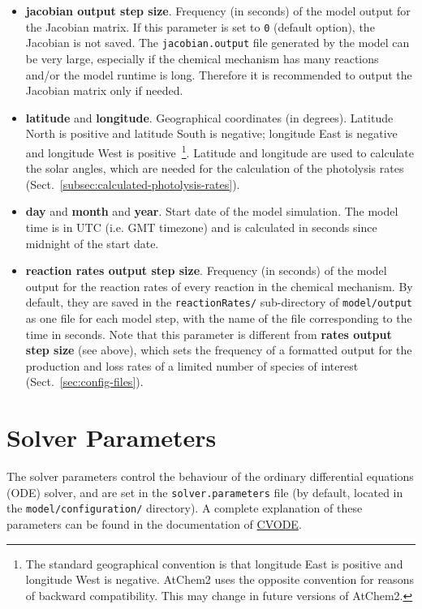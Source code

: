 \begin{itemize}
\item \textbf{jacobian output step size}. Frequency (in seconds) of
  the model output for the Jacobian matrix. If this parameter is set
  to \texttt{0} (default option), the Jacobian is not saved. The
  \texttt{jacobian.output} file generated by the model can be very
  large, especially if the chemical mechanism has many reactions
  and/or the model runtime is long. Therefore it is recommended to
  output the Jacobian matrix only if needed.
\item \textbf{latitude} and \textbf{longitude}. Geographical
  coordinates (in degrees). Latitude North is positive and latitude
  South is negative; longitude East is negative and longitude West is
  positive~\footnote{The standard geographical convention is that
    longitude East is positive and longitude West is negative. AtChem2
    uses the opposite convention for reasons of backward
    compatibility. This may change in future versions of
    AtChem2.}. Latitude and longitude are used to calculate the solar
  angles, which are needed for the calculation of the photolysis rates
  (Sect.~\ref{subsec:calculated-photolysis-rates}).
\item \textbf{day} and \textbf{month} and \textbf{year}. Start date of
  the model simulation. The model time is in UTC (i.e. GMT timezone)
  and is calculated in seconds since midnight of the start date.
\item \textbf{reaction rates output step size}. Frequency (in seconds)
  of the model output for the reaction rates of every reaction in the
  chemical mechanism. By default, they are saved in the
  \texttt{reactionRates/} sub-directory of \texttt{model/output}
  as one file for each model step, with the name of the file
  corresponding to the time in seconds. Note that this parameter is
  different from \textbf{rates output step size} (see above), which
  sets the frequency of a formatted output for the production and loss
  rates of a limited number of species of interest
  (Sect.~\ref{sec:config-files}).
\end{itemize}

\section{Solver Parameters} \label{sec:solver-parameters}

The solver parameters control the behaviour of the ordinary
differential equations (ODE) solver, and are set in the
\texttt{solver.parameters} file (by default, located in the
\texttt{model/configuration/} directory). A complete explanation of
these parameters can be found in the documentation of
\href{https://computing.llnl.gov/projects/sundials/cvode}{CVODE}.

